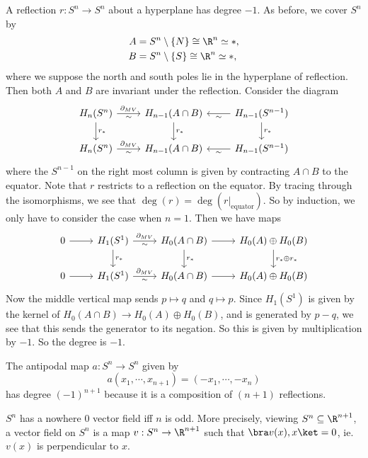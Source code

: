 \documentclass[a4paper]{article}
\begin{document}
\begin{prop}
  A reflection $r: S^n \to S^n$ about a hyperplane has degree $-1$. As before, we cover $S^n$ by
  \begin{align*}
    A &= S^n \setminus \{N\} \cong \R^n \simeq *,\\
    B &= S^n \setminus \{S\} \cong \R^n \simeq *,
  \end{align*}
  where we suppose the north and south poles lie in the hyperplane of reflection. Then both $A$ and $B$ are invariant under the reflection. Consider the diagram
  \[
    \begin{tikzcd}
      H_n(S^n) \ar[r, "\partial_{MV}", "\sim"'] \ar[d, "r_*"] & H_{n - 1}(A \cap B) \ar[d, "r_*"] & H_{n - 1}(S^{n - 1}) \ar[l, "\sim"] \ar[d, "r_*"]\\
      H_n(S^n) \ar[r, "\partial_{MV}", "\sim"'] & H_{n - 1}(A \cap B) & H_{n - 1}(S^{n - 1}) \ar[l, "\sim"]
    \end{tikzcd}
  \]
  where the $S^{n - 1}$ on the right most column is given by contracting $A \cap B$ to the equator. Note that $r$ restricts to a reflection on the equator. By tracing through the isomorphisms, we see that $\deg(r) = \deg(r|_{\mathrm{equator}})$. So by induction, we only have to consider the case when $n = 1$. Then we have maps
  \[
    \begin{tikzcd}
      0 \ar[r] & H_1(S^1) \ar[r, "\partial_{MV}", "\sim"'] \ar[d, "r_*"] & H_0(A \cap B) \ar[d, "r_*"] \ar[r] & H_0(A) \oplus H_0(B) \ar[d, "r_* \oplus r_*"]\\
      0 \ar[r] & H_1(S^1) \ar[r, "\partial_{MV}", "\sim"'] & H_0(A \cap B) \ar[r] & H_0(A) \oplus H_0(B)
    \end{tikzcd}
  \]
  Now the middle vertical map sends $p \mapsto q$ and $q \mapsto p$. Since $H_1(S^1)$ is given by the kernel of $H_0(A \cap B) \to H_0(A) \oplus H_0(B)$, and is generated by $p - q$, we see that this sends the generator to its negation. So this is given by multiplication by $-1$. So the degree is $-1$.
\end{prop}

\begin{cor}
  The antipodal map $a: S^n \to S^n$ given by
  \[
    a(x_1, \cdots, x_{n + 1}) = (-x_1, \cdots, -x_n)
  \]
  has degree $(-1)^{n + 1}$ because it is a composition of $(n + 1)$ reflections.
\end{cor}

\begin{cor}
  $S^n$ has a nowhere $0$ vector field iff $n$ is odd. More precisely, viewing $S^n \subseteq \R^{n + 1}$, a vector field on $S^n$ is a map $v: S^n \to \R^{n + 1}$ such that $\bra v(x), x\ket = 0$, ie. $v(x)$ is perpendicular to $x$.
\end{cor}
\end{document}
